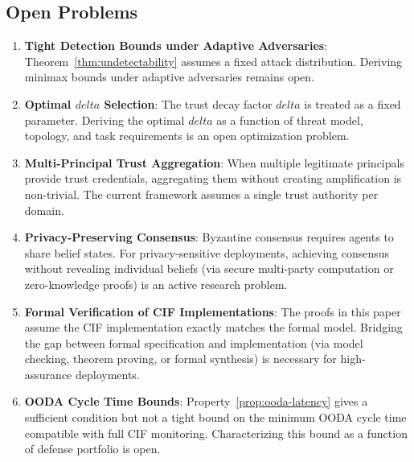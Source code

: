 \documentclass[
]{article}
\begin{document}
\subsection{Open Problems}\label{sec:open-problems}

\begin{enumerate}
\item \textbf{Tight Detection Bounds under Adaptive Adversaries}: Theorem~\ref{thm:undetectability} assumes a fixed attack distribution. Deriving minimax bounds under adaptive adversaries remains open.

\item \textbf{Optimal $delta$ Selection}: The trust decay factor $delta$ is treated as a fixed parameter. Deriving the optimal $delta$ as a function of threat model, topology, and task requirements is an open optimization problem.

\item \textbf{Multi-Principal Trust Aggregation}: When multiple legitimate principals provide trust credentials, aggregating them without creating amplification is non-trivial. The current framework assumes a single trust authority per domain.

\item \textbf{Privacy-Preserving Consensus}: Byzantine consensus requires agents to share belief states. For privacy-sensitive deployments, achieving consensus without revealing individual beliefs (via secure multi-party computation or zero-knowledge proofs) is an active research problem.

\item \textbf{Formal Verification of CIF Implementations}: The proofs in this paper assume the CIF implementation exactly matches the formal model. Bridging the gap between formal specification and implementation (via model checking, theorem proving, or formal synthesis) is necessary for high-assurance deployments.

\item \textbf{OODA Cycle Time Bounds}: Property~\ref{prop:ooda-latency} gives a sufficient condition but not a tight bound on the minimum OODA cycle time compatible with full CIF monitoring. Characterizing this bound as a function of defense portfolio is open.
\end{enumerate}
\end{document}
